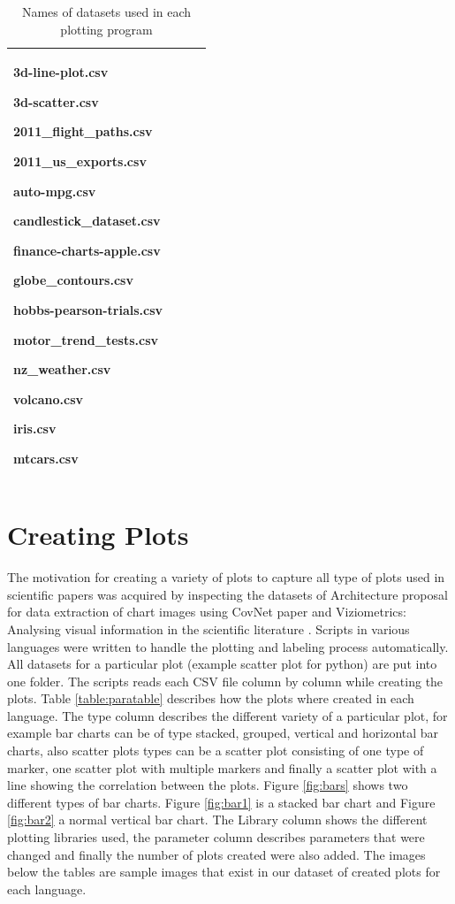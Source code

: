 \documentclass[12pt, a4paper,oneside]{report}
\begin{document}
\begin{table}[!htbp]
\begin{adjustbox}{max width=1.1\textwidth,center}
\begin{tabular}{|p{5cm}|p{3cm}|p{3cm}|p{4cm}|}
		3d-line-plot.csv \par 3d-scatter.csv \par 2011\_flight\_paths.csv \par 2011\_us\_exports.csv \par auto-mpg.csv \par candlestick\_dataset.csv \par finance-charts-apple.csv \par 
		globe\_contours.csv\par hobbs-pearson-trials.csv \par motor\_trend\_tests.csv \par 
		nz\_weather.csv \par volcano.csv \par iris.csv \par mtcars.csv	\\ \hline
		
	\end{tabular}
	
\end{adjustbox}


\caption {Names of datasets used in each plotting program}	
\label{table:1}
\end{table}


\section{Creating Plots}
The motivation for creating a variety of plots to capture all type of plots used in scientific papers was acquired by inspecting the datasets of Architecture proposal for data extraction of chart images using CovNet paper \cite{junior2017archi} and Viziometrics: Analysing visual information in the scientific literature \cite{lee2018viziometrics}. Scripts in various languages were written to handle the plotting and labeling process automatically. All datasets for a particular plot (example scatter plot for python) are put into one folder. The scripts reads each CSV file column by column while creating the plots.
Table \ref{table:paratable} describes how the plots where created in each language. The type column describes the different variety of a particular plot, for example bar charts can be of type stacked, grouped, vertical and horizontal bar charts, also scatter plots types can be a scatter plot consisting of one type of marker, one scatter plot with multiple markers and finally a scatter plot with a line showing the correlation between the plots. 
Figure \ref{fig:bars} shows two different types of bar charts. Figure \ref{fig:bar1} is a stacked bar chart and  Figure \ref{fig:bar2} a normal vertical bar chart.
The Library column shows the different plotting libraries used, the parameter column describes parameters that were changed and finally the number of plots created were also added. The images below the tables are sample images that exist in our dataset of created plots for each language.
\end{document}
